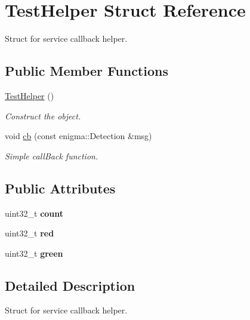 \hypertarget{struct_test_helper}{}\section{Test\+Helper Struct Reference}
\label{struct_test_helper}


Struct for service callback helper.  


\subsection*{Public Member Functions}
\begin{DoxyCompactItemize}
\item 
\mbox{\label{struct_test_helper_ae17c73ef2a5c492a3602ac49a0b11c96}} 
\hyperlink{struct_test_helper_ae17c73ef2a5c492a3602ac49a0b11c96}{Test\+Helper} ()
\begin{DoxyCompactList}\small\item\em Construct the object. \end{DoxyCompactList}\item 
void \hyperlink{struct_test_helper_a62f1c37b402ca6eb912585d8086ab32a}{cb} (const enigma\+::\+Detection \&msg)
\begin{DoxyCompactList}\small\item\em Simple call\+Back function. \end{DoxyCompactList}\end{DoxyCompactItemize}
\subsection*{Public Attributes}
\begin{DoxyCompactItemize}
\item 
\mbox{\label{struct_test_helper_a25a07e5c9e1aaf4ec710f79226794790}} 
uint32\+\_\+t {\bfseries count}
\item 
\mbox{\label{struct_test_helper_a203fc7833a573c316986c6e04c33fa90}} 
uint32\+\_\+t {\bfseries red}
\item 
\mbox{\label{struct_test_helper_a8b154b688786614a800e4f9d3b48651b}} 
uint32\+\_\+t {\bfseries green}
\end{DoxyCompactItemize}


\subsection{Detailed Description}
Struct for service callback helper. 

